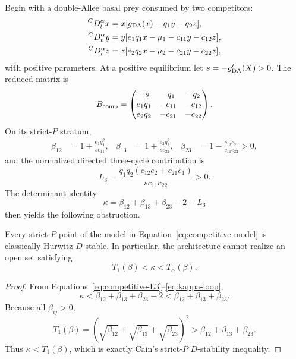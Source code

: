 Begin with a double-Allee basal prey consumed by two competitors:
\begin{align}
 {}^CD_t^\alpha x&=x[g_{\rm DA}(x)-q_1y-q_2z],\nonumber\\
 {}^CD_t^\alpha y&=y[e_1q_1x-\mu_1-c_{11}y-c_{12}z],\label{eq:competitive-model}\\
 {}^CD_t^\alpha z&=z[e_2q_2x-\mu_2-c_{21}y-c_{22}z],\nonumber
\end{align}
with positive parameters. At a positive equilibrium let \(s=-g_{\rm DA}'(X)>0\). The reduced matrix is
\begin{equation}
 B_{\rm comp}
 =
 \begin{pmatrix}
 -s&-q_1&-q_2\\
 e_1q_1&-c_{11}&-c_{12}\\
 e_2q_2&-c_{21}&-c_{22}
 \end{pmatrix}.
 \label{eq:Bcomp}
\end{equation}
On its strict-\(P\) stratum,
\begin{align}
 \beta_{12}&=1+\frac{e_1q_1^2}{sc_{11}},&
 \beta_{13}&=1+\frac{e_2q_2^2}{sc_{22}},&
 \beta_{23}&=1-\frac{c_{12}c_{21}}{c_{11}c_{22}}>0,
 \label{eq:competitive-betas}
\end{align}
and the normalized directed three-cycle contribution is
\begin{equation}
 L_3
 =
 \frac{q_1q_2(c_{12}e_2+c_{21}e_1)}
 {sc_{11}c_{22}}>0.
 \label{eq:competitive-L3}
\end{equation}
The determinant identity
\begin{equation}
 \kappa
 =
 \beta_{12}+\beta_{13}+\beta_{23}-2-L_3
 \label{eq:kappa-loop}
\end{equation}
then yields the following obstruction.

\begin{Theorem}\label{thm:no-go}
Every strict-\(P\) point of the model in Equation~\eqref{eq:competitive-model} is classically Hurwitz \(D\)-stable. In particular, the architecture cannot realize an open set satisfying
\[
 T_1(\beta)<\kappa<T_\alpha(\beta).
\]
\end{Theorem}

\begin{proof}
From Equations~\eqref{eq:competitive-L3}--\eqref{eq:kappa-loop},
\[
 \kappa
 <
 \beta_{12}+\beta_{13}+\beta_{23}-2
 <
 \beta_{12}+\beta_{13}+\beta_{23}.
\]
Because all \(\beta_{ij}>0\),
\[
 T_1(\beta)
 =
 \left(
 \sqrt{\beta_{12}}+\sqrt{\beta_{13}}+\sqrt{\beta_{23}}
 \right)^2
 >
 \beta_{12}+\beta_{13}+\beta_{23}.
\]
Thus \(\kappa<T_1(\beta)\), which is exactly Cain's strict-\(P\) \(D\)-stability inequality.
\end{proof}

